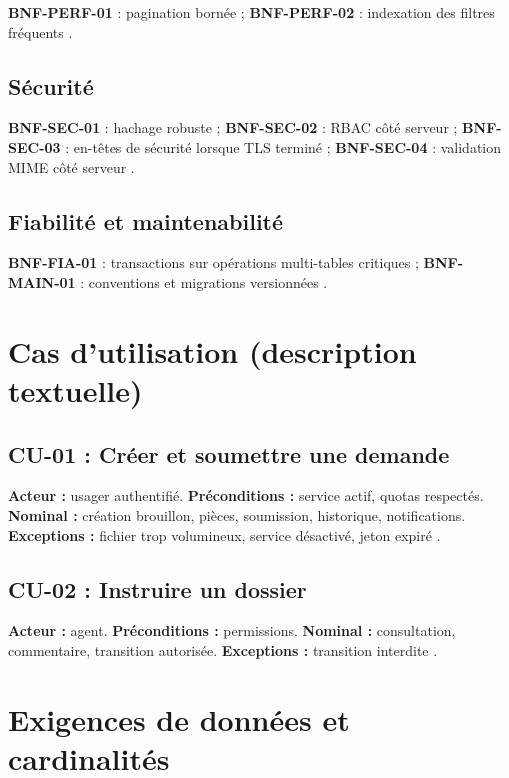 \textbf{BNF-PERF-01} : pagination bornée ; \textbf{BNF-PERF-02} : indexation des filtres fréquents \cite{postgresdoc,kleppmann2017}.

\subsection{Sécurité}

\textbf{BNF-SEC-01} : hachage robuste ; \textbf{BNF-SEC-02} : RBAC côté serveur ; \textbf{BNF-SEC-03} : en-têtes de sécurité lorsque TLS terminé ; \textbf{BNF-SEC-04} : validation MIME côté serveur \cite{owasp2021,laraveldoc}.

\subsection{Fiabilité et maintenabilité}

\textbf{BNF-FIA-01} : transactions sur opérations multi-tables critiques ; \textbf{BNF-MAIN-01} : conventions et migrations versionnées \cite{sommerville2016,kleppmann2017}.

\newpage
\section{Cas d'utilisation (description textuelle)}

\subsection{CU-01 : Créer et soumettre une demande}

\textbf{Acteur :} usager authentifié. \textbf{Préconditions :} service actif, quotas respectés. \textbf{Nominal :} création brouillon, pièces, soumission, historique, notifications. \textbf{Exceptions :} fichier trop volumineux, service désactivé, jeton expiré \cite{booch2005}.

\subsection{CU-02 : Instruire un dossier}

\textbf{Acteur :} agent. \textbf{Préconditions :} permissions. \textbf{Nominal :} consultation, commentaire, transition autorisée. \textbf{Exceptions :} transition interdite \cite{ieee1012}.

\section{Exigences de données et cardinalités}

